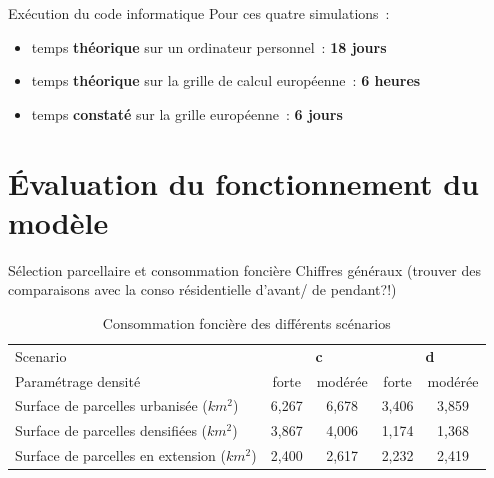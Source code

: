 \documentclass[xcolor=table]{beamer}
\begin{document}
\begin{frame}{Exécution du code informatique}
Pour ces quatre simulations~:
	\begin{itemize}
		\item temps \textbf{théorique} sur un ordinateur personnel~: \textbf{18 jours}
		\item temps \textbf{théorique} sur la grille de calcul européenne~: \textbf{6 heures}
		\item temps \textbf{constaté} sur la grille européenne~: \textbf{6 jours}
	\end{itemize}
\end{frame}

\section{Évaluation du fonctionnement du modèle}

\begin{frame}{Sélection parcellaire et consommation foncière}
	Chiffres généraux (trouver des comparaisons avec la conso résidentielle d'avant/ de pendant?!)
	\begin{table}
		\caption{Consommation foncière des différents scénarios}
		\scriptsize
		\begin{tabular}{|lcccc|}
			\hline 
		Scenario & \multicolumn{2}{c}{\textbf{c}}  & \multicolumn{2}{c}{\textbf{d}} \\  
		Paramétrage densité & forte &modérée&  forte&modérée\\
			\hline 
		Surface de parcelles urbanisée ($km^{2}$)& 6,267 &6,678&3,406& 3,859 \\	
			\hline 
		Surface de parcelles densifiées ($km^{2}$)& 3,867 &4,006&1,174& 1,368\\	
			\hline 
		Surface de parcelles en extension ($km^{2}$)&2,400&2,617&2,232&2,419\\ 
			\hline 
		\end{tabular} 
	\end{table}

\end{frame}
\end{document}
